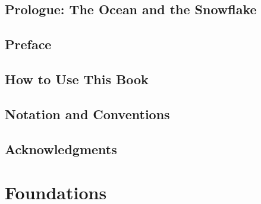 \documentclass[11pt,letterpaper,openany]{book}
\begin{document}
\frontmatter





\cleardoublepage


\chapter*{Prologue: The Ocean and the Snowflake}


\chapter*{Preface}


\chapter*{How to Use This Book}


\chapter*{Notation and Conventions}


\chapter*{Acknowledgments}


\tableofcontents
\listoffigures
\listoftables

\mainmatter

\part{Foundations}







\end{document}
